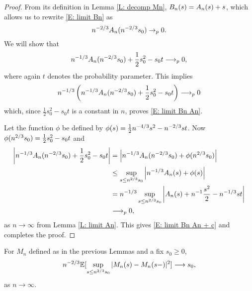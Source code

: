 \begin{proof} \label{P: limit Bn}
	From its definition in Lemma \ref{L: decomp Mn}, $B_n(s) = A_n(s) + s$, which allows us to rewrite \ref{E: limit Bn} as
	\begin{equation} \label{E: limit Bn An}
	n^{-2 / 3} A_n(n^{-2 / 3}s_0) \rightarrow_p 0.
	\end{equation}
	We will show that
	\begin{equation} \label{E: limit Bn An + c}
	n^{-1 / 3} A_n(n^{-2 / 3}s_0) + \frac{1}{2}s_0^2 - s_0t \longrightarrow_p 0,
	\end{equation}
	where again $t$ denotes the probability parameter. 
	This implies
	\begin{equation*}
	n^{-1 / 3} \left( n^{-1 / 3} A_n(n^{-2 / 3}s_0) + \frac{1}{2}s_0^2 - s_0t \right) \longrightarrow_p 0
	\end{equation*}
	which, since $\frac{1}{2}s_0^2 - s_0t$ is a constant in $n$, proves \ref{E: limit Bn An}.
	
	Let the function $\phi$ be defined by $\phi(s) = \frac{1}{2}n^{-4 / 3}s^2 - n^{-2 / 3}st$.	
	Now $\phi(n^{2 / 3}s_0) = \frac{1}{2}s_0^2 - s_0t$ and
	\begin{align*}
	\left| n^{-1 / 3} A_n(n^{-2 / 3}s_0) + \frac{1}{2}s_0^2 - s_0t \right| 
	&= \left| n^{-1 / 3} A_n(n^{-2 / 3}s_0) + \phi(n^{2 / 3}s_0) \right| \\
	&\leq \sup_{s \leq n^{2 / 3} s_0 } \left| n^{-1 / 3} A_n(s) + \phi(s) \right| \\
	&= n^{-1 / 3} \sup_{s \leq n^{2 / 3} s_0 } \left| A_n(s) + n^{-1}\frac{s^2}{2} - n^{-1 / 3}st \right| \\
	&\longrightarrow_p 0,
	\end{align*}
	as $n \rightarrow \infty$ from Lemma \ref{L: limit An}. This gives \ref{E: limit Bn An + c} and completes the proof.
\end{proof}


\begin{lemma} \label{L: limit Mn}
	For $M_n$ defined as in the previous Lemmas and a fix $s_0 \geq 0$,
	\begin{equation} \label{E: limit Mn}
	n^{-2 / 3} \mathbb{E}[\sup_{s \leq n^{2 / 3} s_0 } |M_n(s) - M_n(s-)|^2] \longrightarrow s_0,
	\end{equation}
	as $n\longrightarrow \infty$.
\end{lemma}

